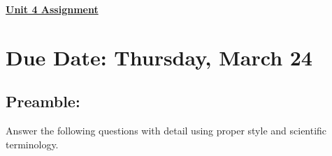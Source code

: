 \documentclass[12pt]{article} %
\begin{document}
	\renewcommand*{\coursecode}{MATH 235} %
	\renewcommand*{\assgnnumber}{Assignment 1} %
	\renewcommand*{\submdate}{September 14, 2021} %
	\renewcommand*{\studentfname}{Abdullah} %
	\renewcommand*{\studentlname}{Zubair} %
    \renewcommand*{\proofname}{Proof:}

	\renewcommand\qedsymbol{$\blacksquare$}
	\setfigpath
	\fancyhfoffset[L,O]{0pt} %




\begin{center}
	\textbf{\underline{\Huge{Unit 4 Assignment}}}
\end{center}

\section*{Due Date: Thursday, March 24}

\subsection*{Preamble:}
Answer the following questions with detail using proper style and scientific terminology.
\end{document}
